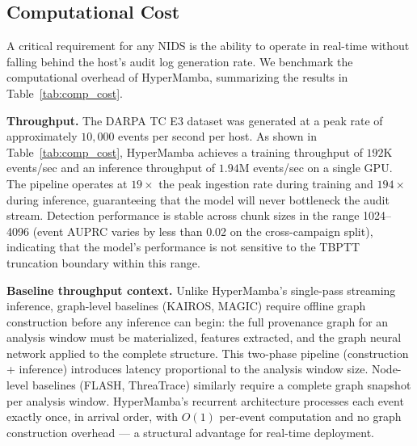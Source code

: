 \documentclass[letterpaper,twocolumn,10pt]{article}
\begin{document}
\subsection{Computational Cost}
\label{sec:computational_cost}

A critical requirement for any NIDS is the ability to operate in real-time without falling behind the host's audit log generation rate. We benchmark the computational overhead of HyperMamba, summarizing the results in Table~\ref{tab:comp_cost}.

\begin{table}[h]
    \centering
    \caption{Computational Cost and Throughput}
    \label{tab:comp_cost}
\end{table}

\textbf{Throughput.} The DARPA TC E3 dataset was generated at a peak rate of approximately $10,000$ events per second per host. As shown in Table~\ref{tab:comp_cost}, HyperMamba achieves a training throughput of $192$K events/sec and an inference throughput of $1.94$M events/sec on a single GPU. The pipeline operates at $19\times$ the peak ingestion rate during training and $194\times$ during inference, guaranteeing that the model will never bottleneck the audit stream. Detection performance is stable across chunk sizes in the range 1024--4096 (event AUPRC varies by less than 0.02 on the cross-campaign split), indicating that the model's performance is not sensitive to the TBPTT truncation boundary within this range.

\textbf{Baseline throughput context.} Unlike HyperMamba's single-pass streaming inference, graph-level baselines (KAIROS, MAGIC) require offline graph construction before any inference can begin: the full provenance graph for an analysis window must be materialized, features extracted, and the graph neural network applied to the complete structure. This two-phase pipeline (construction + inference) introduces latency proportional to the analysis window size. Node-level baselines (FLASH, ThreaTrace) similarly require a complete graph snapshot per analysis window. HyperMamba's recurrent architecture processes each event exactly once, in arrival order, with $O(1)$ per-event computation and no graph construction overhead --- a structural advantage for real-time deployment.
\end{document}
